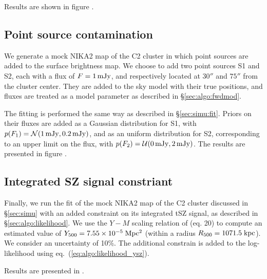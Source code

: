 Results are shown in figure \todo.

\subsection{Point source contamination} \label{sec:simu:ps}

We generate a mock NIKA2 map of the C2 cluster in which point sources are added to the surface brightness map.
We choose to add two point sources S1 and S2, each with a flux of $F = 1 \, {\rm mJy}$, and respectively located at $30''$ and $75''$ from the cluster center.
They are added to the sky model with their true positions, and fluxes are treated as a model parameter as described in \S\ref{sec:algo:fwdmod}.

The fitting is performed the same way as described in \S\ref{sec:simu:fit}.
Priors on their fluxes are added as a Gaussian distribution for S1, with $p(F_1) = \mathcal{N}(1 \,{\rm mJy}, 0.2 \,{\rm mJy})$, and as an uniform distribution for S2, corresponding to an upper limit on the flux, with $p(F_2) = \mathcal{U}(0 \,{\rm mJy}, 2 \,{\rm mJy})$.
The results are presented in figure \todo.

\subsection{Integrated SZ signal constriant} \label{sec:simu:Ysz}

Finally, we run the fit of the mock NIKA2 map of the C2 cluster discussed in \S\ref{sec:simu} with an added constraint on its integrated tSZ signal, as described in \S\ref{sec:algo:likelihood}.
We use the $Y-M$ scaling relation of \citet{arnaud_universal_2010} (eq. 20) to compute an estimated value of $Y_{500} = 7.55 \times 10^{-5} \; {\rm Mpc^2}$ (within a radius $R_{500} = 1071.5 \; {\rm kpc}$).
We consider an uncertainty of 10\%.
The additional constrain is added to the log-likelihood using eq.~(\ref{eq:algo:likelihood_ysz}).

Results are presented in \todo.